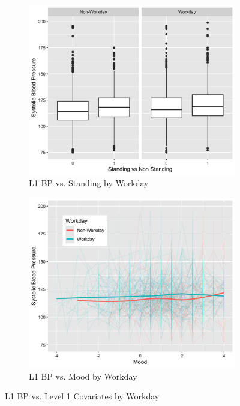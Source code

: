 \documentclass[12pt,twoside,letterpaper]{article}
\theoremstyle{definition}
\theoremstyle{definition}
\begin{document}
\begin{figure}
    \begin{subfigure}{0.48\textwidth}
        \centering
        \includegraphics[width=\textwidth]{pics/bp v stand and day.png}
        \caption{{\small L1 BP vs. Standing by Workday}}
        \label{fig: bp v stand and day}
    \end{subfigure}
    \hfill
    \begin{subfigure}{0.48\textwidth}
        \centering
        \includegraphics[width=\textwidth]{pics/bp v mood and day.png}
        \caption{{\small L1 BP vs. Mood by Workday}}
        \label{fig: bp v mood and day}
    \end{subfigure}
    \caption{{\small L1 BP vs. Level 1 Covariates by Workday}}
    \label{fig: bp v level1 and day2}
\end{figure}
\end{document}

